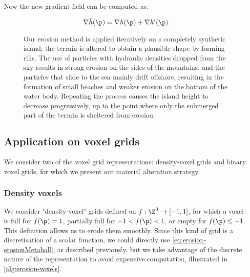 Now the new gradient field can be computed as: 

\begin{align*}
    \nabla \Tilde{h}(\p) = \nabla h(\p) + \nabla h'(\p).
\end{align*}

\begin{figure}
    \caption{Our erosion method is applied iteratively on a completely synthetic island; the terrain is altered to obtain a plausible shape by forming rills. The use of particles with hydraulic densities dropped from the sky results in strong erosion on the sides of the mountains, and the particles that slide to the sea mainly drift offshore, resulting in the formation of small beaches and weaker erosion on the bottom of the water body. Repeating the process causes the island height to decrease progressively, up to the point where only the submerged part of the terrain is sheltered from erosion.}
    \label{fig:erosion-continuous-erosion}
\end{figure}

\subsection{Application on voxel grids}
\label{sec:erosion-application_on_voxels}

We consider two of the voxel grid representations: density-voxel grids and binary voxel grids, for which we present our material alteration strategy.

\subsubsection{Density voxels}
\label{sec:erosion-application_on_density_voxels}

We consider "density-voxel" grids defined on $f: \Z^3 \to [-1, 1]$, for which a voxel is full for $f(\p) = 1$, partially full for $-1 < f(\p) < 1$, or empty for $f(\p) \leq -1$.  
This definition allows us to erode them smoothly.  
Since this kind of grid is a discretisation of a scalar function, we could directly use \eqref{eq:erosion-erosionMetaball}, as described previously, but we take advantage of the discrete nature of the representation to avoid expensive computation, illustrated in \cref{alg:erosion-voxels}. 

